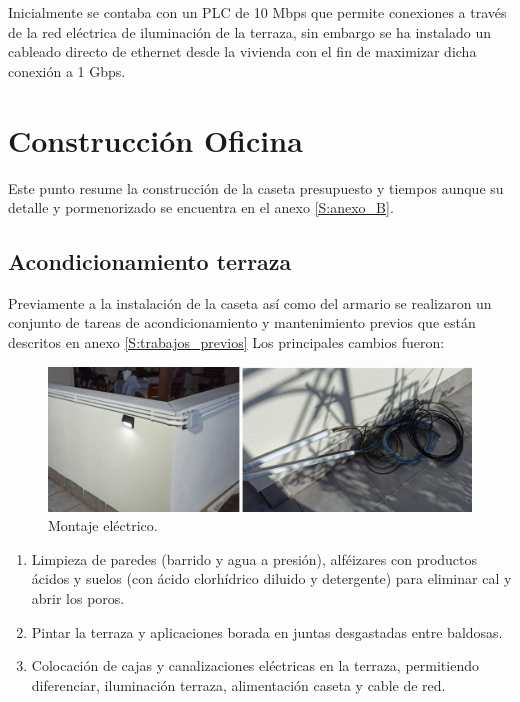 Inicialmente se contaba con un PLC de 10 Mbps que permite conexiones a través de la red eléctrica de iluminación de la terraza, sin embargo se ha instalado un cableado directo de ethernet desde la vivienda con el fin de maximizar dicha conexión a 1 Gbps.

\section{Construcción Oficina}

Este punto resume la construcción de la caseta presupuesto y tiempos aunque su detalle y pormenorizado se encuentra en el anexo \ref{S:anexo_B}.

\subsection{Acondicionamiento terraza}

Previamente a la instalación de la caseta así como del armario se realizaron un conjunto de tareas de acondicionamiento y mantenimiento previos que están descritos en anexo \ref{S:trabajos_previos} Los principales cambios fueron:

\begin{figure}[htb]
\begin{center}
\includegraphics[width=1\textwidth]{./figuras/montaje_electrico.jpg}
\caption{Montaje eléctrico.}
\label{F:montaje_electrico}
\end{center}
\end{figure}

\begin{enumerate}
    \item Limpieza de paredes (barrido y agua a presión), alféizares con productos ácidos y suelos (con ácido clorhídrico diluido y detergente) para eliminar cal y abrir los poros.    
    \item Pintar la terraza y aplicaciones borada en juntas desgastadas entre baldosas.    
    \item Colocación de cajas y canalizaciones eléctricas en la terraza, permitiendo diferenciar, iluminación terraza, alimentación caseta y cable de red.
\end{enumerate}

